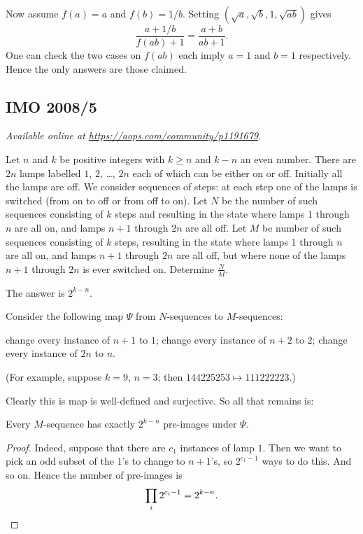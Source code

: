 \documentclass[11pt]{scrartcl}
\begin{document}
Now assume $f(a) = a$ and $f(b) = 1/b$.
Setting $(\sqrt a, \sqrt b, 1, \sqrt{ab})$ gives
\[ \frac{a + 1/b}{f(ab) + 1} = \frac{a+b}{ab+1}. \]
One can check the two cases on $f(ab)$ each imply
$a=1$ and $b=1$ respectively.
Hence the only answers are those claimed.
\pagebreak

\subsection{IMO 2008/5}
\textsl{Available online at \url{https://aops.com/community/p1191679}.}
\begin{mdframed}[style=mdpurplebox,frametitle={Problem statement}]
Let $n$ and $k$ be positive integers
with $k \geq n$ and $k - n$ an even number.
There are $2n$ lamps labelled $1$, $2$, \dots, $2n$
each of which can be either on or off.
Initially all the lamps are off.
We consider sequences of steps:
at each step one of the lamps is switched
(from on to off or from off to on).
Let $N$ be the number of such sequences consisting of $k$ steps
and resulting in the state where lamps $1$ through $n$ are all on,
and lamps $n + 1$ through $2n$ are all off.
Let $M$ be number of such sequences consisting of $k$ steps,
resulting in the state where lamps $1$ through $n$ are all on,
and lamps $n + 1$ through $2n$ are all off,
but where none of the lamps $n + 1$ through $2n$ is ever switched on.
Determine $\frac{N}{M}$.
\end{mdframed}
The answer is $2^{k-n}$.

Consider the following map $\Psi$ from $N$-sequences to $M$-sequences:
\begin{itemize}
  \ii change every instance of $n+1$ to $1$;
  \ii change every instance of $n+2$ to $2$;
  \ii[$\vdots$]
  \ii change every instance of $2n$ to $n$.
\end{itemize}
(For example, suppose $k=9$, $n=3$;
then $144225253 \mapsto 111222223$.)

Clearly this is map is well-defined and surjective.
So all that remains is:
\begin{claim*}
  Every $M$-sequence has exactly $2^{k-n}$ pre-images under $\Psi$.
\end{claim*}
\begin{proof}
  Indeed, suppose that there are $c_1$ instances of lamp $1$.
  Then we want to pick an odd subset of the $1$'s to change to $n+1$'s,
  so $2^{c_1 - 1}$ ways to do this.
  And so on.
  Hence the number of pre-images is
  \[ \prod_i 2^{c_i - 1} = 2^{k-n}. \qedhere \]
\end{proof}
\pagebreak
\end{document}
